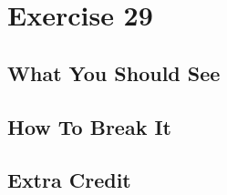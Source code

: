 \chapter{Exercise 29}


\section{What You Should See}


\section{How To Break It}


\section{Extra Credit}



